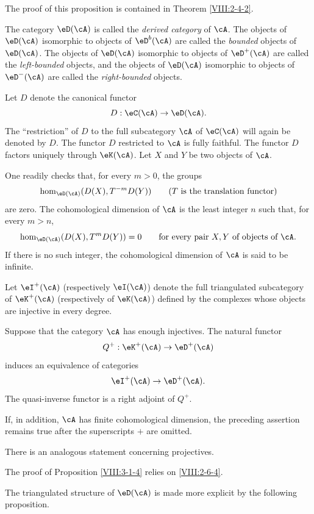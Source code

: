 \documentclass[oneside]{book}
\begin{document}
The proof of this proposition is contained in Theorem \ref{VIII:2-4-2}.

\begin{definition}\label{VIII:3-1-3}
The category $\eD(\cA)$ is called the \emph{derived category} of $\cA$.
The objects of $\eD(\cA)$ isomorphic to objects of $\eD^b(\cA)$ are
called the \emph{bounded} objects of $\eD(\cA)$. The objects of
$\eD(\cA)$ isomorphic to objects of $\eD^+(\cA)$ are called the
\emph{left-bounded} objects, and the objects of $\eD(\cA)$ isomorphic to
objects of $\eD^-(\cA)$ are called the \emph{right-bounded} objects.
\end{definition}

Let $D$ denote the canonical functor
\[
  D : \eC(\cA) \to \eD(\cA) \text{.}
\]
The “restriction” of $D$ to the full subcategory $\cA$ of $\eC(\cA)$
will again be denoted by $D$. The functor $D$ restricted to $\cA$ is fully
faithful. The functor $D$ factors uniquely through $\eK(\cA)$. Let $X$
and $Y$ be two objects of $\cA$.

One readily checks that, for every $m>0$, the groups
\[
  \hom_{\eD(\cA)}(D(X),T^{-m} D(Y)) \qquad \text{($T$ is the translation functor)}
\]
are zero. The cohomological dimension of $\cA$ is the least integer $n$
such that, for every $m>n$,
\[
  \hom_{\eD(\cA)}(D(X),T^m D(Y)) = 0 \qquad\text{for every pair $X,Y$ of objects of $\cA$.}
\]
If there is no such integer, the cohomological dimension of $\cA$ is said
to be infinite.

Let $\eI^+(\cA)$ (respectively $\eI(\cA)$) denote the full triangulated
subcategory of $\eK^+(\cA)$ (respectively of $\eK(\cA)$) defined by the
complexes whose objects are injective in every degree.

\begin{proposition}\label{VIII:3-1-4}
Suppose that the category $\cA$ has enough injectives. The natural functor
\[
  Q^+:\eK^+(\cA) \to \eD^+(\cA)
\]
induces an equivalence of categories
\[
  \eI^+(\cA) \to \eD^+(\cA)  \text{.}
\]
The quasi-inverse functor is a right adjoint of $Q^+$.
\end{proposition}

If, in addition, $\cA$ has finite cohomological dimension, the preceding
assertion remains true after the superscripts $+$ are omitted.

There is an analogous statement concerning projectives.

The proof of Proposition \ref{VIII:3-1-4} relies on
\ref{VIII:2-6-4}.

The triangulated structure of $\eD(\cA)$ is made more explicit by the
following proposition.
\end{document}
